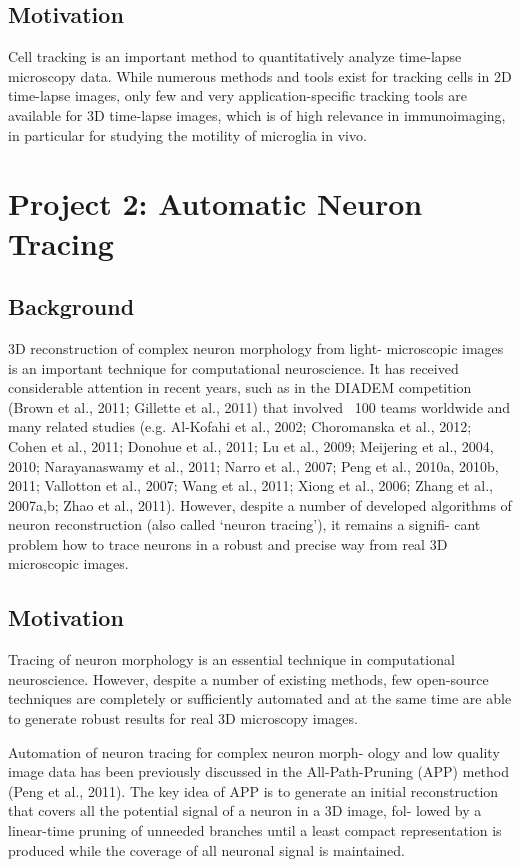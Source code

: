 \subsection{Motivation}
Cell tracking is an important method to quantitatively analyze time-lapse microscopy data. While numerous methods and tools exist for tracking cells in 2D time-lapse images, only few and very application-specific tracking tools are available for 3D time-lapse images, which is of high relevance in immunoimaging, in particular for studying the motility of microglia in vivo.
\section{Project 2: Automatic Neuron Tracing}
\subsection{Background}
3D reconstruction of complex neuron morphology from light- microscopic images is an important technique for computational neuroscience. It has received considerable attention in recent years, such as in the DIADEM competition (Brown et al., 2011; Gillette et al., 2011) that involved ~100 teams worldwide and many related studies (e.g. Al-Kofahi et al., 2002; Choromanska et al., 2012; Cohen et al., 2011; Donohue et al., 2011; Lu et al., 2009; Meijering et al., 2004, 2010; Narayanaswamy et al., 2011; Narro et al., 2007; Peng et al., 2010a, 2010b, 2011; Vallotton et al., 2007; Wang et al., 2011; Xiong et al., 2006; Zhang et al., 2007a,b; Zhao et al., 2011). However, despite a number of developed algorithms of neuron reconstruction (also called ‘neuron tracing’), it remains a signifi- cant problem how to trace neurons in a robust and precise way from real 3D microscopic images.

\subsection{Motivation}
Tracing of neuron morphology is an essential technique in computational neuroscience. However, despite a number of existing methods, few open-source techniques are completely or sufficiently automated and at the same time are able to generate robust results for real 3D microscopy images.

Automation of neuron tracing for complex neuron morph- ology and low quality image data has been previously discussed in the All-Path-Pruning (APP) method (Peng et al., 2011). The key idea of APP is to generate an initial reconstruction that covers all the potential signal of a neuron in a 3D image, fol- lowed by a linear-time pruning of unneeded branches until a least compact representation is produced while the coverage of all neuronal signal is maintained.

